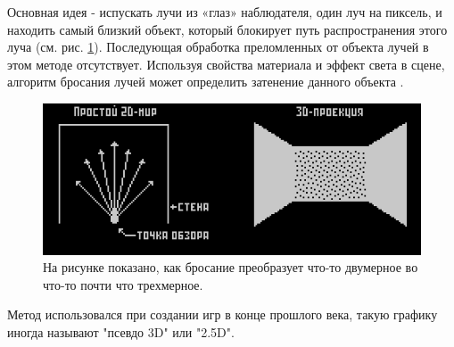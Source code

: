 Основная идея -  испускать лучи из «глаз» наблюдателя, один луч на пиксель, и находить самый близкий объект,
который блокирует путь распространения этого луча (см. рис. \ref{fig:raycast_ex}). 
Последующая обработка преломленных от объекта лучей в этом методе отсутствует.
Используя свойства материала и эффект света в сцене, алгоритм бросания лучей может определить затенение данного объекта \cite{article:raycasting}.

\begin{figure}
  \centering
  \includegraphics[scale=0.8]{inc/img/raycast_ex}
  \caption{На рисунке показано, как бросание преобразует что-то двумерное во что-то почти что трехмерное.}
  \label{fig:raycast_ex}
\end{figure}

Метод использовался при создании игр в конце прошлого века, такую графику иногда называют "псевдо 3D" или "2.5D". 

